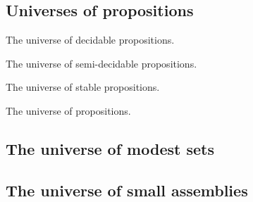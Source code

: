 \subsection{Universes of propositions}
\label{sec:universe-propositions}

The universe of decidable propositions.

The universe of semi-decidable propositions.

The universe of stable propositions.

The universe of propositions.

\subsection{The universe of modest sets}
\label{sec:universe-modest-sets}

\subsection{The universe of small assemblies}
\label{sec:univ-small-assembl}



